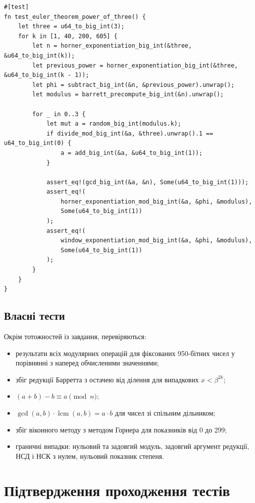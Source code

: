 \documentclass[11pt]{article}
\begin{document}
\begin{lstlisting}[style=ruststyle]
#[test]
fn test_euler_theorem_power_of_three() {
    let three = u64_to_big_int(3);
    for k in [1, 40, 200, 605] {
        let n = horner_exponentiation_big_int(&three, &u64_to_big_int(k));
        let previous_power = horner_exponentiation_big_int(&three, &u64_to_big_int(k - 1));
        let phi = subtract_big_int(&n, &previous_power).unwrap();
        let modulus = barrett_precompute_big_int(&n).unwrap();

        for _ in 0..3 {
            let mut a = random_big_int(modulus.k);
            if divide_mod_big_int(&a, &three).unwrap().1 == u64_to_big_int(0) {
                a = add_big_int(&a, &u64_to_big_int(1));
            }

            assert_eq!(gcd_big_int(&a, &n), Some(u64_to_big_int(1)));
            assert_eq!(
                horner_exponentiation_mod_big_int(&a, &phi, &modulus),
                Some(u64_to_big_int(1))
            );
            assert_eq!(
                window_exponentiation_mod_big_int(&a, &phi, &modulus),
                Some(u64_to_big_int(1))
            );
        }
    }
}
\end{lstlisting}

\subsection{Власні тести}

Окрім тотожностей із завдання, перевіряються:
\begin{itemize}
    \item результати всіх модулярних операцій для фіксованих 950-бітних чисел
          у порівнянні з наперед обчисленими значеннями;
    \item збіг редукції Барретта з остачею від ділення для випадкових $x < \beta^{2k}$;
    \item $(a + b) - b \equiv a \pmod{n}$;
    \item $\gcd(a, b) \cdot \operatorname{lcm}(a, b) = a \cdot b$ для чисел зі спільним дільником;
    \item збіг віконного методу з методом Горнера для показників від 0 до 299;
    \item граничні випадки: нульовий та задовгий модуль, задовгий аргумент
          редукції, НСД і НСК з нулем, нульовий показник степеня.
\end{itemize}

\section{Підтвердження проходження тестів}
\end{document}
